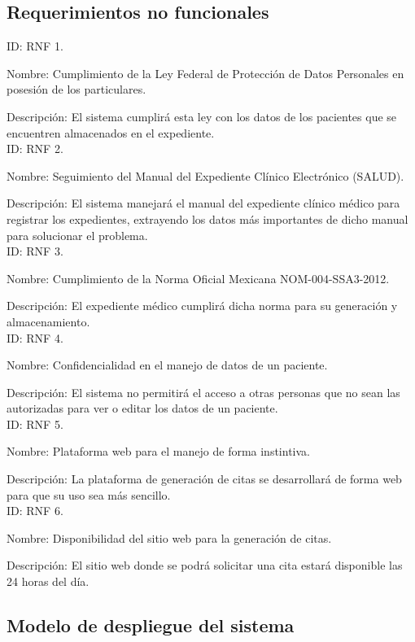 \subsection{Requerimientos no funcionales}

ID: RNF 1.

Nombre: Cumplimiento de la Ley Federal de Protección de Datos Personales en posesión de los particulares.

Descripción: El sistema cumplirá esta ley con los datos de los pacientes que se encuentren almacenados en el expediente. \\

ID: RNF 2.

Nombre: Seguimiento del Manual del Expediente Clínico Electrónico (SALUD).

Descripción: El sistema manejará el manual del expediente clínico médico para registrar los expedientes, extrayendo los datos más importantes de dicho manual para solucionar el problema. \\

ID: RNF 3.

Nombre: Cumplimiento de la Norma Oficial Mexicana NOM-004-SSA3-2012.

Descripción: El expediente médico cumplirá dicha norma para su generación y almacenamiento. \\

ID: RNF 4.

Nombre: Confidencialidad en el manejo de datos de un paciente.

Descripción: El sistema no permitirá el acceso a otras personas que no sean las autorizadas para ver o editar los datos de un paciente. \\

ID: RNF 5. 

Nombre: Plataforma web para el manejo de forma instintiva.

Descripción: La plataforma de generación de citas se desarrollará de forma web para que su uso sea más sencillo. \\

ID: RNF 6.

Nombre: Disponibilidad del sitio web para la generación de citas.

Descripción: El sitio web donde se podrá solicitar una cita estará disponible las 24 horas del día.

\subsection{Modelo de despliegue del sistema}

